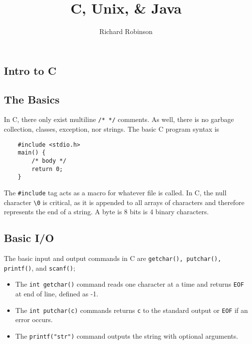 \documentclass{tufte-book}
\title{C, Unix, \& Java}
\author{Richard Robinson}
\begin{document}
\maketitle
\tableofcontents
\setlength{\parindent}{0pt}
\begin{fullwidth}

\chapter{Intro to C}

\section{The Basics}
In C, there only exist multiline \lstinline{/* */} comments. As well, there is no garbage collection, classes, exception, nor strings. The basic C program syntax is
\begin{lstlisting}
    #include <stdio.h>
    main() {
        /* body */
        return 0;
    }
\end{lstlisting}
The \lstinline{#include} tag acts as a macro for whatever file is called. In C, the null character \lstinline{\0} is critical, as it is appended to all arrays of characters and therefore represents the end of a string. A byte is 8 bits is 4 binary characters.

\section{Basic I/O}
The basic input and output commands in C are \lstinline{getchar(), putchar(), printf()}, and \lstinline{scanf()};
\begin{itemize}
    \item The \lstinline{int getchar()} command reads one character at a time and returns \lstinline{EOF} at end of line, defined as -1.

    \item The \lstinline{int putchar(c)} commands returns \lstinline{c} to the standard output or \lstinline{EOF} if an error occurs.

    \item The \lstinline{printf("str")} command outputs the string with optional arguments.


\end{itemize}
\end{fullwidth}
\end{document}
